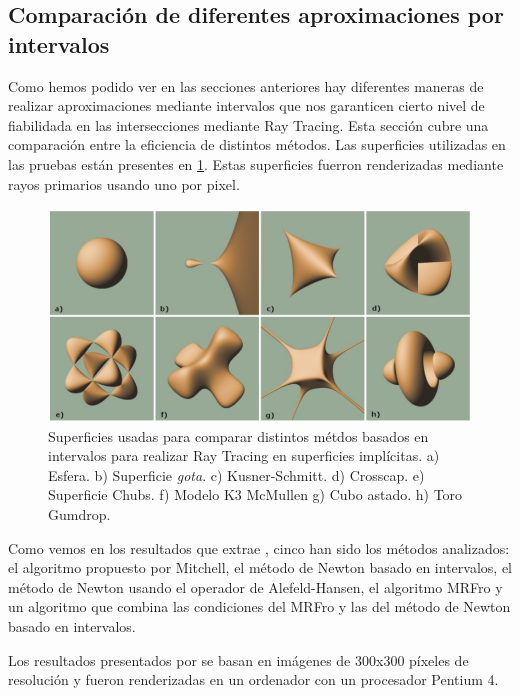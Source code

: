 \subsection{Comparación de diferentes aproximaciones por intervalos}

Como hemos podido ver en las secciones anteriores hay diferentes maneras de realizar aproximaciones mediante intervalos que nos garanticen cierto nivel de fiabilidada en las intersecciones mediante Ray Tracing. Esta sección cubre una comparación entre la eficiencia  de distintos métodos. Las superficies utilizadas en las pruebas están presentes en \ref{florez49}. Estas superficies fuerron renderizadas mediante rayos primarios usando uno por pixel.

\begin{figure}[h]
	\centering
	\includegraphics[scale=0.5]{images/florez6.png}
	\caption{Superficies usadas para comparar distintos métdos basados en intervalos para realizar Ray Tracing en superficies implícitas. a) Esfera. b) Superficie{ \em gota}. c) Kusner-Schmitt. d) Crosscap. e) Superficie Chubs. f) Modelo K3 McMullen g) Cubo astado. h) Toro Gumdrop.}
	\label{florez49}
\end{figure}

Como vemos en los resultados que extrae \cite{Florez08}, cinco han sido los métodos analizados: el algoritmo propuesto por Mitchell, el método de Newton basado en intervalos, el método de Newton usando el operador de Alefeld-Hansen, el algoritmo MRFro y un algoritmo que combina las condiciones del MRFro y las del método de Newton basado en intervalos.

\begin{remark}
Los resultados presentados por \cite{Florez08} se basan en imágenes de 300x300 píxeles de resolución  y fueron renderizadas en un ordenador con un procesador Pentium 4.
\end{remark}

